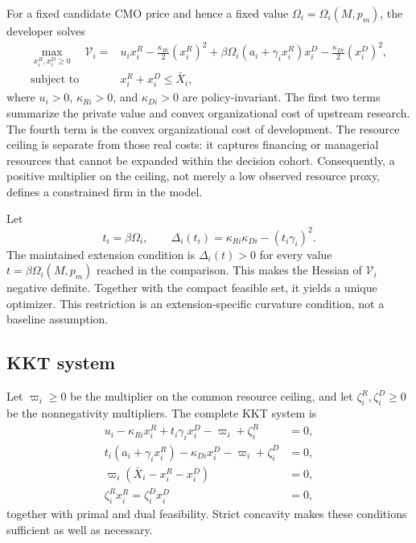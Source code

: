 For a fixed candidate CMO price and hence a fixed value
\(\Omega_i=\Omega_i(M,p_m)\), the developer solves
\begin{equation}
  \begin{aligned}
  \max_{x_i^R,x_i^D\geq0}\quad
  \mathcal V_i
  ={}&
  u_i x_i^R-\frac{\kappa_{Ri}}{2}(x_i^R)^2
  +\beta\Omega_i
       \left(a_i+\gamma_i x_i^R\right)x_i^D
  -\frac{\kappa_{Di}}{2}(x_i^D)^2,\\
  \text{subject to}\quad
  &x_i^R+x_i^D\leq\bar X_i,
  \end{aligned}
  \label{eq:erd-objective}
\end{equation}
where \(u_i>0\), \(\kappa_{Ri}>0\), and \(\kappa_{Di}>0\) are policy-invariant.
The first two terms summarize the private value and convex organizational
cost of upstream research. The fourth term is the convex organizational cost
of development. The resource ceiling is separate from those real costs: it
captures financing or managerial resources that cannot be expanded within
the decision cohort. Consequently, a positive multiplier on the ceiling,
not merely a low observed resource proxy, defines a constrained firm in the
model.

Let
\begin{equation}
  t_i=\beta\Omega_i,
  \qquad
  \Delta_i(t_i)
  =\kappa_{Ri}\kappa_{Di}-(t_i\gamma_i)^2.
  \label{eq:erd-concavity-index}
\end{equation}
The maintained extension condition is \(\Delta_i(t)>0\) for every value
\(t=\beta\Omega_i(M,p_m)\) reached in the comparison. This makes the Hessian
of \(\mathcal V_i\) negative definite. Together with the compact feasible
set, it yields a unique optimizer. This restriction is an extension-specific
curvature condition, not a baseline assumption.

\subsection{KKT system}
\label{subsec:erd-kkt}

Let \(\varpi_i\geq0\) be the multiplier on the common resource ceiling, and
let \(\zeta_i^R,\zeta_i^D\geq0\) be the nonnegativity multipliers. The complete
KKT system is
\begin{align}
  u_i-\kappa_{Ri}x_i^R+t_i\gamma_i x_i^D
  -\varpi_i+\zeta_i^R&=0,
  \label{eq:erd-kkt-research}\\
  t_i(a_i+\gamma_i x_i^R)-\kappa_{Di}x_i^D
  -\varpi_i+\zeta_i^D&=0,
  \label{eq:erd-kkt-development}\\
  \varpi_i(\bar X_i-x_i^R-x_i^D)&=0,
  \label{eq:erd-kkt-budget}\\
  \zeta_i^R x_i^R=\zeta_i^D x_i^D&=0,
  \label{eq:erd-kkt-nonnegative}
\end{align}
together with primal and dual feasibility. Strict concavity makes these
conditions sufficient as well as necessary.

